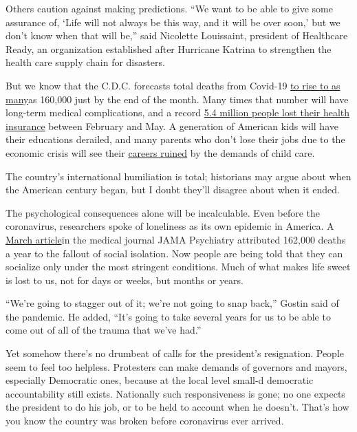 Others caution against making predictions. ``We want to be able to give
some assurance of, `Life will not always be this way, and it will be
over soon,' but we don't know when that will be,'' said Nicolette
Louissaint, president of Healthcare Ready, an organization established
after Hurricane Katrina to strengthen the health care supply chain for
disasters.

But we know that the C.D.C. forecasts total deaths from Covid-19
\href{https://www.cdc.gov/coronavirus/2019-ncov/covid-data/forecasting-us.html}{to
rise to as many}as 160,000 just by the end of the month. Many times that
number will have long-term medical complications, and a record
\href{https://www.nytimes3xbfgragh.onion/2020/07/13/world/coronavirus-updates.html\#link-4a45abca}{5.4
million people lost their health insurance} between February and May. A
generation of American kids will have their educations derailed, and
many parents who don't lose their jobs due to the economic crisis will
see their
\href{https://www.theatlantic.com/family/archive/2020/07/working-parents-careers-school-childcare/613936/}{careers
ruined} by the demands of child care.

The country's international humiliation is total; historians may argue
about when the American century began, but I doubt they'll disagree
about when it ended.

The psychological consequences alone will be incalculable. Even before
the coronavirus, researchers spoke of loneliness as its own epidemic in
America. A
\href{https://jamanetwork.com/journals/jamapsychiatry/fullarticle/2762469?guestAccessKey=b70282f9-d0c1-43f8-ba38-18a2b6831cc7\&utm_source=For_The_Media\&utm_medium=referral\&utm_campaign=ftm_links\&utm_content=tfl\&utm_term=030420}{March
article}in the medical journal JAMA Psychiatry attributed 162,000 deaths
a year to the fallout of social isolation. Now people are being told
that they can socialize only under the most stringent conditions. Much
of what makes life sweet is lost to us, not for days or weeks, but
months or years.

``We're going to stagger out of it; we're not going to snap back,''
Gostin said of the pandemic. He added, ``It's going to take several
years for us to be able to come out of all of the trauma that we've
had.''

Yet somehow there's no drumbeat of calls for the president's
resignation. People seem to feel too helpless. Protesters can make
demands of governors and mayors, especially Democratic ones, because at
the local level small-d democratic accountability still exists.
Nationally such responsiveness is gone; no one expects the president to
do his job, or to be held to account when he doesn't. That's how you
know the country was broken before coronavirus ever arrived.

